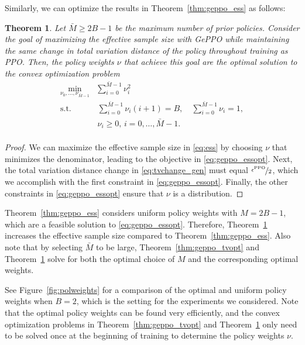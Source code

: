\documentclass{article}
\newtheorem{theorem}{Theorem}
\begin{document}
Similarly, we can optimize the results in Theorem~\ref{thm:geppo_ess} as follows:

\begin{theorem}\label{thm:geppo_essopt}
Let $\bar{M} \geq 2B-1$ be the maximum number of prior policies. Consider the goal of maximizing the effective sample size with GePPO while maintaining the same change in total variation distance of the policy throughout training as PPO. Then, the policy weights $\nu$ that achieve this goal are the optimal solution to the convex optimization problem
\begin{equation}\label{eq:geppo_essopt}
\begin{split}
\min_{\nu_0,\ldots,\nu_{\bar{M}-1}} & \sum_{i=0}^{\bar{M}-1} \nu_i^2  \\
\mathrm{s.t.} \quad & \, \sum_{i=0}^{\bar{M}-1} \nu_i (i+1) = B, \quad  \sum_{i=0}^{\bar{M}-1} \nu_i = 1,  \\
 & \, \nu_i \geq 0, \, i=0,\ldots,\bar{M}-1. \\
\end{split}
\end{equation}
\end{theorem}

\begin{proof}
We can maximize the effective sample size in \eqref{eq:ess} by choosing $\nu$ that minimizes the denominator, leading to the objective in \eqref{eq:geppo_essopt}. Next, the total variation distance change in \eqref{eq:tvchange_gen} must equal $\nicefrac{\epsilon^{\textnormal{PPO}}}{2}$, which we accomplish with the first constraint in \eqref{eq:geppo_essopt}. Finally, the other constraints in \eqref{eq:geppo_essopt} ensure that $\nu$ is a distribution.
\end{proof}

Theorem~\ref{thm:geppo_ess} considers uniform policy weights with $M=2B-1$, which are a feasible solution to \eqref{eq:geppo_essopt}. Therefore, Theorem~\ref{thm:geppo_essopt} increases the effective sample size compared to Theorem~\ref{thm:geppo_ess}. Also note that by selecting $\bar{M}$ to be large, Theorem~\ref{thm:geppo_tvopt} and Theorem~\ref{thm:geppo_essopt} solve for both the optimal choice of $M$ and the corresponding optimal weights.

See Figure~\ref{fig:polweights} for a comparison of the optimal and uniform policy weights when $B=2$, which is the setting for the experiments we considered. Note that the optimal policy weights can be found very efficiently, and the convex optimization problems in Theorem~\ref{thm:geppo_tvopt} and Theorem~\ref{thm:geppo_essopt} only need to be solved once at the beginning of training to determine the policy weights $\nu$. 
\end{document}
